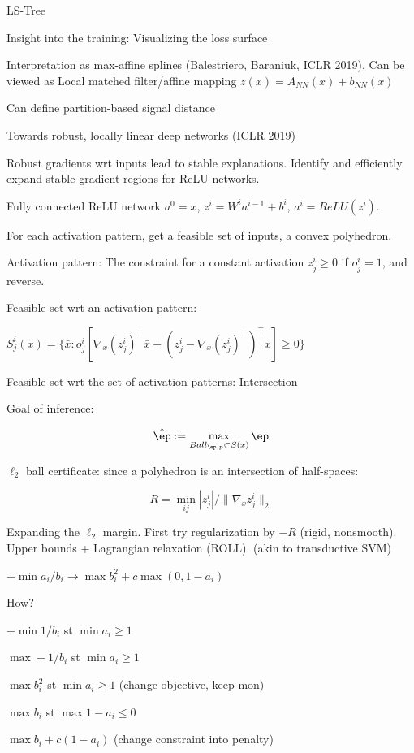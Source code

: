 \documentclass[english]{article}
\begin{document}
LS-Tree


\item  Insight into the training: Visualizing the loss surface

\item Interpretation as max-affine splines (Balestriero, Baraniuk, ICLR 2019). Can be viewed as Local matched filter/affine mapping $z(x) = A_{NN}(x)+b_{NN}(x)$

Can define partition-based signal distance

\item Towards robust, locally linear deep networks (ICLR 2019)

Robust gradients wrt inputs lead to stable explanations. Identify and efficiently expand stable gradient regions for ReLU networks. 

Fully connected ReLU network $a^0=x$, $z^i = W^i a^{i-1}+b^i$, $a^i = ReLU(z^i)$.

For each activation pattern, get a feasible set of inputs, a convex polyhedron. 

Activation pattern: The constraint for a constant activation $z^i_j \ge 0$ if $o^i_j=1$, and reverse. 

Feasible set wrt an activation pattern: 

$S^i_j(x) = \{ \bar x: o^i_j 
[\nabla_x (z^i_j)^\top \bar x  
+ (z^i_j - \nabla_x (z^i_j)^\top)^\top x] \ge 0\}$

Feasible set wrt the set of activation patterns: Intersection 

Goal of inference:

$$\hat \ep := \max_{Ball_{\ep,p}\subset S(x)}\ep$$

$\ell_2$ ball certificate: since a polyhedron is an intersection of half-spaces: 

$$R = \min_{ij} |z^i_j|/\|\nabla_x z^i_j\|_2$$

Expanding the $\ell_2$ margin. First try regularization by $-R$ (rigid, nonsmooth). Upper bounds + Lagrangian relaxation (ROLL). (akin to transductive SVM)

$-\min{a_i/b_i} \to \max b_i^2 + c\max(0,1-a_i)$

How? 

$-\min 1/b_i$ st $\min a_i\ge 1$

$\max - 1/b_i$ st $\min a_i\ge 1$

$\max b_i^2$ st $\min  a_i\ge 1$ (change objective, keep mon)

$\max b_i$ st $\max 1-a_i \le 0$ 

$\max b_i + c(1-a_i)$ (change constraint into penalty)
\end{document}
